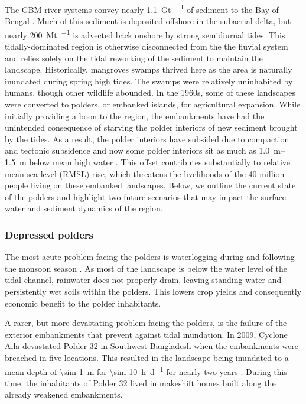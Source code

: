\documentclass{wscpaperproc}
\theoremstyle{wsc}
\begin{document}
The GBM river systems convey nearly \SI{1.1}{\giga\tonne\per\year} of sediment to the Bay of Bengal \cite{millimanGeomorphicTectonicControl1992}. Much of this sediment is deposited offshore in the subaerial delta, but nearly \SI{200}{\mega\tonne\per\year} is advected back onshore by strong semidiurnal tides. This tidally-dominated region is otherwise disconnected from the the fluvial system and relies solely on the tidal reworking of the sediment to maintain the landscape. Historically, mangroves swamps thrived here as the area is naturally inundated during spring high tides. The swamps were relatively uninhabited by humans, though other wildlife abounded. In the 1960s, some of these landscapes were converted to polders, or embanked islands, for agricultural expansion. While initially providing a boon to the region, the embankments have had the unintended consequence of starving the polder interiors of new sediment brought by the tides. As a result, the polder interiors have subsided due to compaction and tectonic subsidence and now some polder interiors sit as much as \SIrange{1.0}{1.5}{\meter} below mean high water \cite{auerbachFloodRiskNatural2015}. This offset contributes substantially to relative mean sea level (RMSL) rise, which threatens the livelihoods of the 40 million people living on these embanked landscapes. Below, we outline the current state of the polders and highlight two future scenarios that may impact the surface water and sediment dynamics of the region.

\subsubsection*{Depressed polders}

The most acute problem facing the polders is waterlogging during and following the monsoon season \cite{khadimIntegratedWaterResources2013a}. As most of the landscape is below the water level of the tidal channel, rainwater does not properly drain, leaving standing water and persistently wet soils within the polders. This lowers crop yields and consequently economic benefit to the polder inhabitants.

A rarer, but more devastating problem facing the polders, is the failure of the exterior embankments that prevent against tidal inundation. In 2009, Cyclone Aila devastated Polder 32 in Southwest Bangladesh when the embankments were breached in five locations. This resulted in the landscape being inundated to a mean depth of \SI{\sim 1}{\meter} for \SI{\sim 10}{\hour\per\day} for nearly two years \cite{auerbachFloodRiskNatural2015}. During this time, the inhabitants of Polder 32 lived in makeshift homes built along the already weakened embankments.
\end{document}
